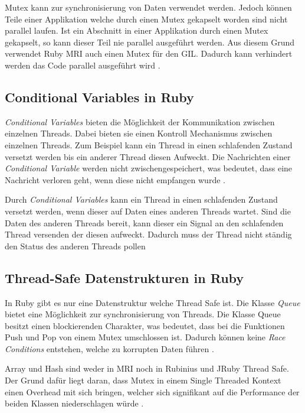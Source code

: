 Mutex kann zur synchronisierung von Daten verwendet werden. Jedoch können Teile einer Applikation welche durch einen Mutex gekapselt worden sind nicht parallel laufen. Ist ein Abschnitt in einer Applikation durch einen Mutex gekapselt, so kann dieser Teil nie parallel ausgeführt werden. Aus diesem Grund verwendet Ruby MRI auch einen Mutex für den GIL. Dadurch kann verhindert werden das Code parallel ausgeführt wird \cite[p. 91]{Sto2013}.

\subsection{Conditional Variables in Ruby}

\emph{Conditional Variables} bieten die Möglichkeit der Kommunikation zwischen einzelnen Threads. Dabei bieten sie einen Kontroll Mechanismus zwischen einzelnen Threads. Zum Beispiel kann ein Thread in einen schlafenden Zustand versetzt werden bis ein anderer Thread diesen Aufweckt. Die Nachrichten einer \emph{Conditional Variable} werden nicht zwischengespeichert, was bedeutet, dass eine Nachricht verloren geht, wenn diese nicht empfangen wurde \cite[p. 748]{tan09}.

Durch \emph{Conditional Variables} kann ein Thread in einen schlafenden Zustand versetzt werden, wenn dieser auf Daten eines anderen Threads wartet. Sind die Daten des anderen Threads bereit, kann dieser ein Signal an den schlafenden Thread versenden der diesen aufweckt. Dadurch muss der Thread nicht ständig den Status des anderen Threads pollen \cite[p. 100]{Sto2013}

\subsection{Thread-Safe Datenstrukturen in Ruby}
In Ruby gibt es nur eine Datenstruktur welche Thread Safe ist. Die Klasse \emph{Queue} bietet eine Möglichkeit zur synchronisierung von Threads. Die Klasse Queue besitzt einen blockierenden Charakter, was bedeutet, dass bei die Funktionen Push und Pop von einem Mutex umschlossen ist. Dadurch können keine \emph{Race Conditions} entstehen, welche zu korrupten Daten führen \cite[p. 110]{Sto2013}. 

Array und Hash sind weder in MRI noch in Rubinius und JRuby Thread Safe. Der Grund dafür liegt daran, dass Mutex in einem Single Threaded Kontext einen Overhead mit sich bringen, welcher sich signifikant auf die Performance der beiden Klassen niederschlagen würde \cite[p. 110]{Sto2013}.

